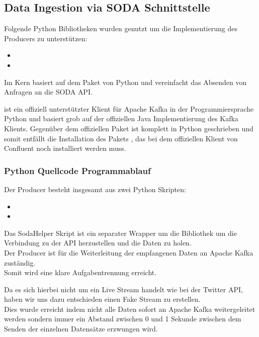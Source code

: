 \subsection{Data Ingestion via \acs{SODA} Schnittstelle}\label{subsec:api}

Folgende Python Bibliotheken wurden genutzt um die Implementierung des Producers zu unterstützen:

\begin{itemize}
  \item {}
  \item {}
\end{itemize}

Im Kern basiert  auf dem  Paket von Python und vereinfacht das Absenden von Anfragen an die \ac{SODA} \ac{API}.\autocite{Sodapy}

 ist ein offiziell unterstützter Klient für Apache Kafka in der Programmiersprache Python und basiert grob auf der offiziellen Java Implementierung des Kafka Klients.\autocite{KafkaPython}
Gegenüber dem offiziellen Paket  ist  komplett in Python geschrieben und somit entfällt die Installation des Pakets ,
das bei dem offiziellen Klient von Confluent noch installiert werden muss.\autocite{KafkaClients}
\newpage
\subsubsection{Python Quellcode Programmablauf}
Der Producer besteht insgesamt aus zwei Python Skripten:

\begin{itemize}
  \item {}
  \item {}
\end{itemize}

Das SodaHelper Skript ist ein separater Wrapper um die  Bibliothek um die Verbindung zu der \ac{API} herzustellen und die Daten zu holen.
\\
Der Producer ist für die Weiterleitung der empfangenen Daten an Apache Kafka zuständig.
\\
Somit wird eine klare Aufgabentrennung erreicht.

Da es sich hierbei nicht um ein Live Stream handelt wie \zb{} bei der Twitter \ac{API}, haben wir uns dazu entschieden einen \glqq Fake Stream\grqq{} zu erstellen.
\\
Dies wurde erreicht indem nicht alle Daten sofort an Apache Kafka weitergeleitet werden sondern immer ein Abstand zwischen 0 und 1 Sekunde zwischen dem Senden der einzelnen Datensätze
erzwungen wird.

